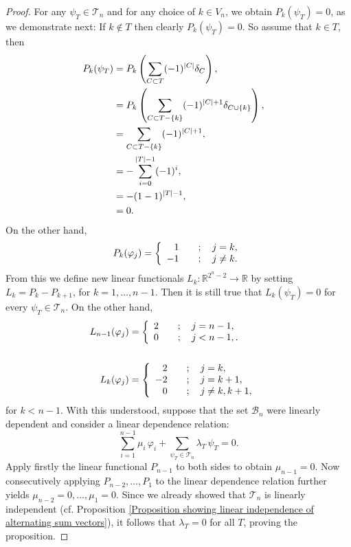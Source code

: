 \documentclass[10pt,a4paper]{amsart}
\begin{document}
\begin{proof}
For any $\psi_T\in \mathcal T_n$ and for any choice of $k\in V_n$, we obtain $P_k(\psi_T) = 0$, as we demonstrate next: If $k\notin T$ then clearly $P_k(\psi_T)=0$. So assume that $k\in T$, then 
\begin{align*}
P_k(\psi_T) & = P_k\left(\sum _{C\subset T} (-1)^{|C|} \delta_C  \right), \cr
& = P_k\left(\sum _{C\subset T-\{k\}} (-1)^{|C|+1} \delta_{C\cup\{k\}}  \right), \cr
& = \sum _{C\subset T-\{k\}} (-1)^{|C|+1},   \cr
& = -\sum _{i=0}^{|T|-1} (-1)^i, \cr 
& = - (1-1)^{|T|-1},\cr
& = 0. 
\end{align*}  
On the other hand, 
$$P_k(\varphi_j) = \left\{ 
\begin{array}{rl}
1 & \quad ; \quad j=k, \cr
-1 & \quad ; \quad j\ne k.
\end{array} 
\right. 
$$
From this we define new linear functionals $L_k:\mathbb R^{2^n-2}\to \mathbb R$ by setting $L_k = P_k - P_{k+1}$, for $k=1,\dots, n-1$. Then it is still true that $L_k(\psi_T)=0$ for every $\psi _T\in \mathcal T_n$. On the other hand,   
\begin{align*}
L_{n-1}(\varphi_j) & = \left\{ 
\begin{array}{rl}
2 & \quad ; \quad j=n-1, \cr
0 & \quad ; \quad j< n-1,.
\end{array} 
\right. \cr
& \cr 
L_{k}(\varphi_j) & = \left\{ 
\begin{array}{rl}
2 & \quad ; \quad j=k, \cr
-2 & \quad ; \quad j=k+1, \cr
0 & \quad ; \quad j\ne k, k+1,
\end{array} 
\right.
\end{align*}
for $k<n-1$. With this understood, suppose that the set $\mathcal B_n$ were linearly dependent and consider a linear dependence relation:
$$\sum _{i=1}^{n-1}\mu_i\, \varphi_i + \sum _{\psi_T\in \mathcal T_n}\lambda _T\,  \psi_T = 0. $$
Apply firstly the linear functional $P_{n-1}$ to both sides to obtain $\mu_{n-1} = 0$. Now consecutively applying $P_{n-2}, \dots, P_1$ to the linear dependence relation further yields $\mu_{n-2} =0, \dots, \mu_1=0$. Since we already showed that $\mathcal T_n$ is linearly independent (cf. Proposition \ref{Proposition showing linear independence of alternating sum vectors}), it follows that $\lambda _T=0$ for all $T$, proving the proposition. 
\end{proof}
\end{document}
